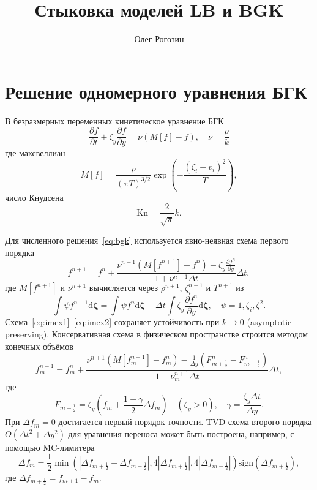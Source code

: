 \documentclass{article}
\title{Стыковка моделей LB и BGK}
\author{Олег Рогозин}
\theoremstyle{plain}
\newcommand{\Kn}{\mathrm{Kn}}
\newcommand{\dd}{\mathrm{d}}
\newcommand{\pder}[2][]{\frac{\partial#1}{\partial#2}}
\newcommand{\dzeta}{\boldsymbol{\dd\zeta}}
\newcommand{\OO}[1]{O(#1)}
\begin{document}
\section{Решение одномерного уравнения БГК}

В безразмерных переменных кинетическое уравнение БГК
\begin{equation}\label{eq:bgk}
    \pder[f]{t} + \zeta_y\pder[f]{y} = \nu(M[f]-f), \quad \nu = \frac{\rho}k
\end{equation}
где максвеллиан
\begin{equation}\label{eq:Maxwell}
    M[f] = \frac{\rho}{(\pi T)^{3/2}}\exp\left(-\frac{(\zeta_i - v_i)^2}T\right),
\end{equation}
число Кнудсена
\begin{equation}\label{eq:Knudsen}
    \Kn = \frac2{\sqrt\pi}k.
\end{equation}

Для численного решения~\eqref{eq:bgk} используется явно-неявная схема первого порядка
\begin{equation}\label{eq:imex1}
    f^{n+1} = f^n + \frac{\nu^{n+1}(M[f^{n+1}]-f^n) - \zeta_y\pder[f^{n}]{y}}{1+\nu^{n+1}\Delta{t}}\Delta{t},
\end{equation}
где \(M[f^{n+1}]\) и \(\nu^{n+1}\) вычисляется через \(\rho^{n+1}\), \(\zeta^{n+1}_i\) и \(T^{n+1}\) из
\begin{equation}\label{eq:imex2}
    \int\psi f^{n+1}\dzeta = \int\psi f^n\dzeta - \Delta{t}\int\zeta_y\pder[f^{n}]{y}\dzeta, \quad \psi = 1,\zeta_i,\zeta^2.
\end{equation}
Схема~\eqref{eq:imex1}--\eqref{eq:imex2} сохраняет устойчивость при \(k\to0\) (asymptotic preserving).
Консервативная схема в физическом пространстве строится методом конечных объёмов
\begin{equation}\label{eq:discrete_imex}
    f^{n+1}_m = f^n_m + \frac{
        \nu^{n+1}(M[f^{n+1}_m]-f^n_m) - \frac1{\Delta{y}}\left(F^n_{m+\frac12}-F^n_{m-\frac12}\right)
    }{1+\nu^{n+1}_m\Delta{t}}\Delta{t},
\end{equation}
где
\begin{equation}\label{eq:fluxes}
    F_{m+\frac12} = \zeta_y\left( f_m + \frac{1-\gamma}2\Delta{f_m}\right) \quad(\zeta_y>0),
    \quad \gamma = \frac{\zeta_y\Delta{t}}{\Delta{y}}.
\end{equation}
При \(\Delta{f_m} = 0\) достигается первый порядок точности.
TVD-схема второго порядка \(\OO{\Delta{t}^2+\Delta{y}^2}\) для уравнения переноса
может быть построена, например, с помощью MC-лимитера
\begin{equation}\label{eq:MC_limiter}
    \overline{\Delta{f_m}} = \frac12\min\left(
        |\Delta f_{m+\frac12} + \Delta f_{m-\frac12}|, 4|\Delta f_{m+\frac12}|, 4|\Delta f_{m-\frac12}|
    \right)\mathrm{sign}(\Delta f_{m+\frac12}),
\end{equation}
где \(\Delta f_{m+\frac12} = f_{m+1} - f_m\).
\end{document}
